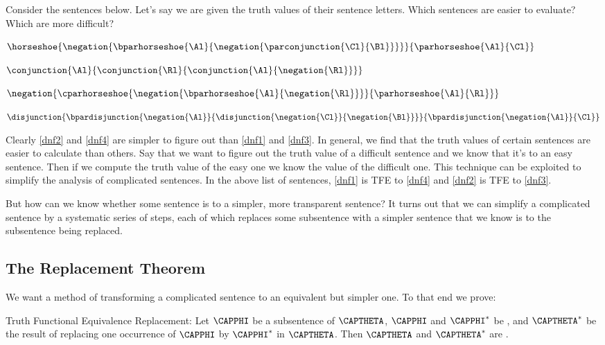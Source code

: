 Consider the sentences below.
Let's say we are given the truth values of their sentence letters.
Which sentences are easier to evaluate? 
Which are more difficult?
\begin{multicols}{2}
\begin{menumerate}
\item\label{dnf1} $\horseshoe{\negation{\bparhorseshoe{\Al}{\negation{\parconjunction{\Cl}{\Bl}}}}}{\parhorseshoe{\Al}{\Cl}}$
\item\label{dnf2} $\conjunction{\Al}{\conjunction{\Rl}{\conjunction{\Al}{\negation{\Rl}}}}$
\item\label{dnf3} $\negation{\cparhorseshoe{\negation{\bparhorseshoe{\Al}{\negation{\Rl}}}}{\parhorseshoe{\Al}{\Rl}}}$
\item\label{dnf4} $\disjunction{\bpardisjunction{\negation{\Al}}{\disjunction{\negation{\Cl}}{\negation{\Bl}}}}{\bpardisjunction{\negation{\Al}}{\Cl}}$
\end{menumerate}
\end{multicols}
\noindent{}Clearly \ref{dnf2} and \ref{dnf4} are simpler to figure out than \ref{dnf1} and \ref{dnf3}. 
In general, we find that the truth values of certain sentences are easier to calculate than others.
Say that we want to figure out the truth value of a difficult sentence and we know that it's  to an easy sentence.
Then if we compute the truth value of the easy one we know the value of the difficult one.
This technique can be exploited to simplify the analysis of complicated \GSL{} sentences.
In the above list of sentences, \ref{dnf1} is TFE to \ref{dnf4} and \ref{dnf2} is TFE to \ref{dnf3}.

But how can we know whether some sentence is  to a simpler, more transparent sentence?
It turns out that we can simplify a complicated sentence by a systematic series of steps, each of which replaces some subsentence with a simpler sentence that we know is  to the subsentence being replaced.  

\subsection{The  Replacement Theorem}\label{The TFE Replacement Theorem}

We want a method of transforming a complicated sentence to an equivalent but simpler one.
To that end we prove:

\begin{THEOREM}{ Truth Functional Equivalence Replacement:}
Let $\CAPPHI$ be a subsentence of $\CAPTHETA$, $\CAPPHI$ and $\CAPPHI^*$ be , and $\CAPTHETA^*$ be the result of replacing one occurrence of $\CAPPHI$ by $\CAPPHI^*$ in $\CAPTHETA$. Then $\CAPTHETA$ and $\CAPTHETA^*$ are .
\end{THEOREM}

